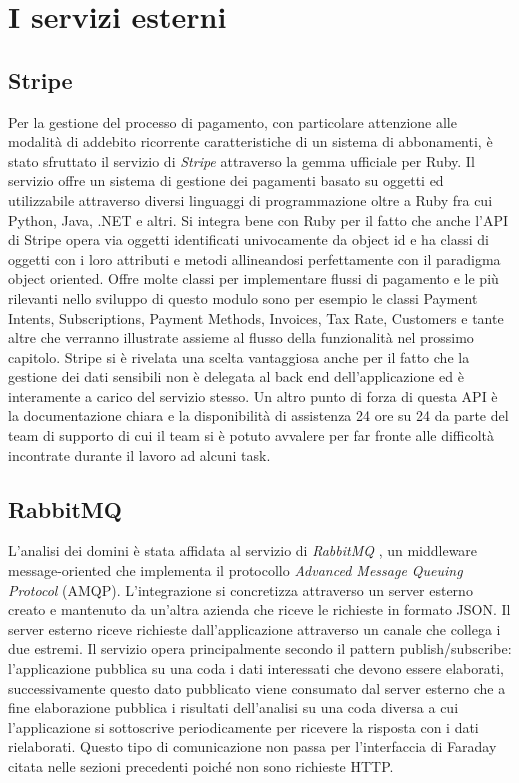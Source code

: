 \documentclass[target=bach,aauheader=,style=]{thud}
\begin{document}
\section{I servizi esterni}

\subsection{Stripe}

Per la gestione del processo di pagamento, con particolare attenzione alle modalità di addebito ricorrente caratteristiche di un sistema di abbonamenti,
è stato sfruttato il servizio di \textit{Stripe} \cite{stripe} attraverso la gemma ufficiale \cite{stripe_ruby_gem} per Ruby. Il servizio offre un sistema di gestione dei pagamenti
basato su oggetti ed utilizzabile attraverso diversi linguaggi di programmazione oltre a Ruby fra cui Python, Java, .NET e altri. Si integra
bene con Ruby per il fatto che anche l'API di Stripe opera via oggetti identificati univocamente da object id e ha classi di oggetti con i loro attributi e metodi allineandosi
perfettamente con il paradigma object oriented.
Offre molte classi per implementare flussi di pagamento e le più rilevanti nello sviluppo di questo modulo sono per esempio le classi Payment Intents, Subscriptions, Payment Methods,
Invoices, Tax Rate, Customers e tante altre che verranno illustrate assieme al flusso della funzionalità nel prossimo capitolo.
Stripe si è rivelata una scelta vantaggiosa anche per il fatto che la gestione dei dati sensibili non è delegata al back end dell'applicazione ed è interamente
a carico del servizio stesso. Un altro punto di forza di questa API è la documentazione chiara \cite{stripe_api_reference} e la disponibilità di assistenza 24 ore su 24 da parte
del team di supporto di cui il team si è potuto avvalere per far fronte alle difficoltà incontrate durante il lavoro ad alcuni task.

\subsection{RabbitMQ}

L'analisi dei domini è stata affidata al servizio di \textit{RabbitMQ} \cite{rabbitmq}, un middleware message-oriented che implementa il protocollo \textit{Advanced Message Queuing Protocol} (AMQP).
L'integrazione si concretizza attraverso un server esterno creato e mantenuto da un'altra azienda che riceve le richieste in formato JSON.
Il server esterno riceve richieste dall'applicazione attraverso un canale che collega i due estremi.
Il servizio opera principalmente secondo il pattern publish/subscribe: l'applicazione pubblica su una coda i dati interessati che devono essere elaborati,
successivamente questo dato pubblicato viene consumato dal server esterno che a fine elaborazione pubblica i risultati dell'analisi su una coda diversa
a cui l'applicazione si sottoscrive periodicamente per ricevere la risposta con i dati rielaborati.
Questo tipo di comunicazione non passa per l'interfaccia di Faraday citata nelle sezioni precedenti poiché non sono richieste HTTP.
\end{document}
